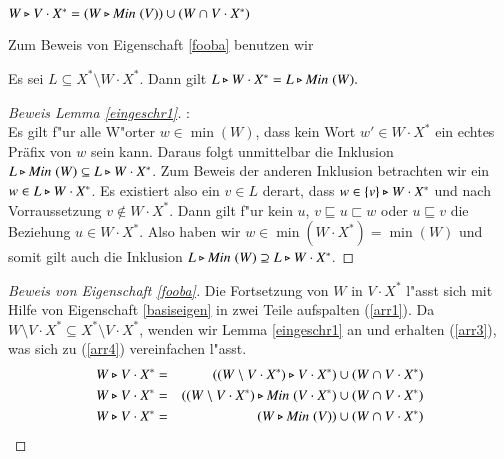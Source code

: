 \begin{eigen}\label{fooba}
$W\triangleright V\cdot X^* = (W\triangleright\mathit{Min}\;(V)) \cup (W\cap V\cdot X^*)$
\end{eigen}
Zum Beweis von Eigenschaft \ref{fooba} benutzen wir

\vspace{2ex}

\begin{lem}\label{eingeschr1}
Es sei $L\subseteq X^*\setminus W\cdot X^*$. Dann gilt $L\triangleright W\cdot X^* = L\triangleright \mathit{Min}\;(W).$
\end{lem}
\begin{proof}[Beweis Lemma \ref{eingeschr1}]:\\
Es gilt f"ur alle W"orter $w\in\min(W)$, dass kein Wort $w'\in W\cdot X^*$ ein echtes Präfix von $w$ sein kann.
Daraus folgt unmittelbar die Inklusion $L\triangleright \mathit{Min}\;(W) \subseteq L\triangleright W\cdot X^*$.
Zum Beweis der anderen Inklusion betrachten wir ein $w\in L\triangleright W\cdot X^*$. Es existiert also ein $v\in L$ derart, dass $w\in \{v\}\triangleright W\cdot X^*$ und nach Vorraussetzung $v\notin W\cdot X^*$. Dann gilt f"ur kein $u$, $v\sqsubseteq u\sqsubset w$ oder $u\sqsubseteq v$ die Beziehung $u\in W\cdot X^*$.
Also haben wir $w\in\min(W\cdot X^*) = \min(W)$ und somit gilt auch die Inklusion $L\triangleright \mathit{Min}\;(W) \supseteq L\triangleright W\cdot X^*$.
\end{proof}

\begin{proof}[Beweis von Eigenschaft \ref{fooba}]
Die Fortsetzung von $W$ in $V\cdot X^*$ l"asst sich mit Hilfe von Eigenschaft \ref{basiseigen} in zwei Teile aufspalten (\ref{arr1}).
Da $W\setminus V\cdot X^* \subseteq X^*\setminus V\cdot X^*$, wenden wir Lemma \ref{eingeschr1} an und erhalten (\ref{arr3}), was sich zu (\ref{arr4}) vereinfachen l"asst.
\setcounter{equation}{0}
\begin{eqnarray}
W\triangleright V\cdot X^* & = & ((W\setminus V\cdot X^*) \triangleright V\cdot X^*) \cup (W\cap V\cdot X^*) \label{arr1}\\
W\triangleright V\cdot X^* & = & ((W\setminus V\cdot X^*)  \triangleright \mathit{Min}\;(V\cdot X^*) \cup (W\cap V\cdot X^*) \label{arr3} \\
W\triangleright V\cdot X^* & = &(W \triangleright \mathit{Min}\;(V)) \cup (W\cap V\cdot X^*) \label{arr4}
\end{eqnarray}
\end{proof}






